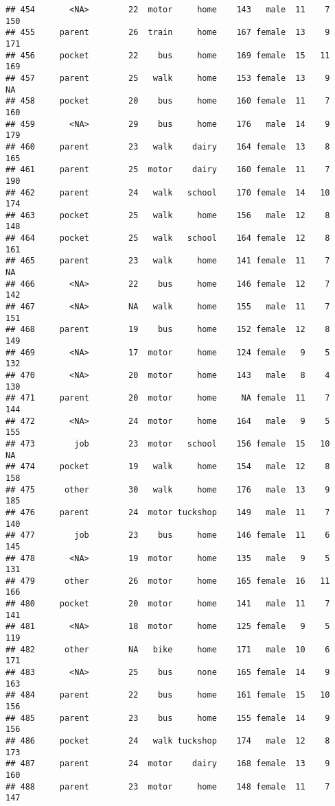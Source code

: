 \documentclass[
]{article}
\begin{document}
\begin{verbatim}
## 454       <NA>        22  motor     home    143   male  11    7     150
## 455     parent        26  train     home    167 female  13    9     171
## 456     pocket        22    bus     home    169 female  15   11     169
## 457     parent        25   walk     home    153 female  13    9      NA
## 458     pocket        20    bus     home    160 female  11    7     160
## 459       <NA>        29    bus     home    176   male  14    9     179
## 460     parent        23   walk    dairy    164 female  13    8     165
## 461     parent        25  motor    dairy    160 female  11    7     190
## 462     parent        24   walk   school    170 female  14   10     174
## 463     pocket        25   walk     home    156   male  12    8     148
## 464     pocket        25   walk   school    164 female  12    8     161
## 465     parent        23   walk     home    141 female  11    7      NA
## 466       <NA>        22    bus     home    146 female  12    7     142
## 467       <NA>        NA   walk     home    155   male  11    7     151
## 468     parent        19    bus     home    152 female  12    8     149
## 469       <NA>        17  motor     home    124 female   9    5     132
## 470       <NA>        20  motor     home    143   male   8    4     130
## 471     parent        20  motor     home     NA female  11    7     144
## 472       <NA>        24  motor     home    164   male   9    5     155
## 473        job        23  motor   school    156 female  15   10      NA
## 474     pocket        19   walk     home    154   male  12    8     158
## 475      other        30   walk     home    176   male  13    9     185
## 476     parent        24  motor tuckshop    149   male  11    7     140
## 477        job        23    bus     home    146 female  11    6     145
## 478       <NA>        19  motor     home    135   male   9    5     131
## 479      other        26  motor     home    165 female  16   11     166
## 480     pocket        20  motor     home    141   male  11    7     141
## 481       <NA>        18  motor     home    125 female   9    5     119
## 482      other        NA   bike     home    171   male  10    6     171
## 483       <NA>        25    bus     none    165 female  14    9     163
## 484     parent        22    bus     home    161 female  15   10     156
## 485     parent        23    bus     home    155 female  14    9     156
## 486     pocket        24   walk tuckshop    174   male  12    8     173
## 487     parent        24  motor    dairy    168 female  13    9     160
## 488     parent        23  motor     home    148 female  11    7     147

\end{verbatim}
\end{document}
